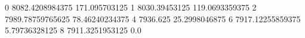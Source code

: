 0 8082.4208984375 171.095703125
1 8030.39453125 119.0693359375
2 7989.78759765625 78.46240234375
4 7936.625 25.2998046875
6 7917.12255859375 5.79736328125
8 7911.3251953125 0.0
